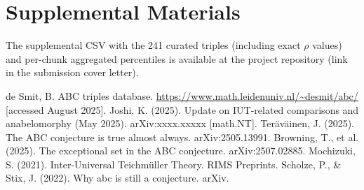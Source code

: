 \documentclass[11pt,a4paper]{article}
\begin{document}
\appendix
\section{Supplemental Materials}
The supplemental CSV with the 241 curated triples (including exact \(\rho\) values) and per-chunk aggregated percentiles is available at the project repository (link in the submission cover letter).

\begin{thebibliography}{30}
 de Smit, B. ABC triples database. \url{https://www.math.leidenuniv.nl/~desmit/abc/} [accessed August 2025].
 Joshi, K. (2025). Update on IUT-related comparisons and anabelomorphy (May 2025). arXiv:xxxx.xxxxx [math.NT].
 Teräväinen, J. (2025). The ABC conjecture is true almost always. arXiv:2505.13991.
 Browning, T., et al. (2025). The exceptional set in the ABC conjecture. arXiv:2507.02885.
 Mochizuki, S. (2021). Inter-Universal Teichmüller Theory. RIMS Preprints.
 Scholze, P., \& Stix, J. (2022). Why abc is still a conjecture. arXiv.
\end{thebibliography}
\end{document}
